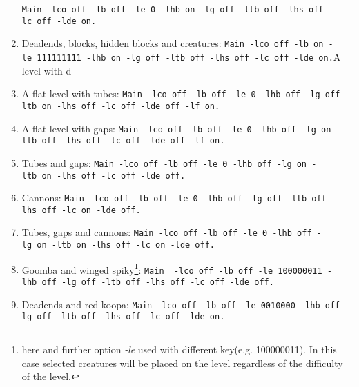 \documentclass{report}
\begin{document}
\begin{enumerate}
\texttt{Main~-lco~off~-lb~off~-le~0~-lhb~on~-lg~off~-ltb~off~-lhs~off~-lc~off~-lde~on.}
\item Deadends, blocks, hidden blocks and creatures:\newline %
\texttt{Main~-lco~off~-lb~on~-le~111111111~-lhb~on~-lg~off~-ltb~off~-lhs~off~-lc~off~-lde~on.}A level with d
\item A flat level with tubes: \newline %
\texttt{Main~-lco~off~-lb~off~-le~0~-lhb~off~-lg~off~-ltb~on~-lhs~off~-lc~off~-lde~off~-lf~on.}
\item A flat level with gaps: \newline %
\texttt{Main~-lco~off~-lb~off~-le~0~-lhb~off~-lg~on~-ltb~off~-lhs~off~-lc~off~-lde~off~-lf~on.}
\item Tubes and gaps: \newline %
\texttt{Main~-lco~off~-lb~off~-le~0~-lhb~off~-lg~on~-ltb~on~-lhs~off~-lc~off~-lde~off.}
\item Cannons: \newline %
\texttt{Main~-lco~off~-lb~off~-le~0~-lhb~off~-lg~off~-ltb~off~-lhs~off~-lc~on~-lde~off.}
\item Tubes, gaps and cannons: \newline %
\texttt{Main~-lco~off~-lb~off~-le~0~-lhb~off~-lg~on~-ltb~on~-lhs~off~-lc~on~-lde~off.}
\item Goomba and winged spiky\footnote{here and further option \emph{-le} used with different key(e.g. 100000011). In this case selected creatures will be placed on the level regardless of the difficulty of the level.}: \newline %
\texttt{Main ~-lco~off~-lb~off~-le~100000011~-lhb~off~-lg~off~-ltb~off~-lhs~off~-lc~off~-lde~off.}
\item Deadends and red koopa: \newline %
\texttt{Main~-lco~off~-lb~off~-le~0010000~-lhb~off~-lg~off~-ltb~off~-lhs~off~-lc~off~-lde~on.}


\end{enumerate}
\end{document}
